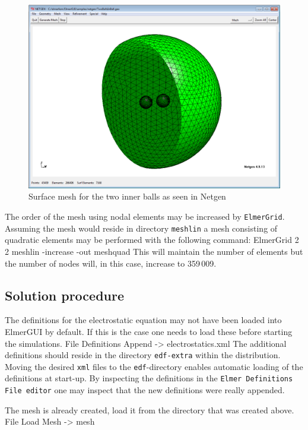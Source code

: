 \begin{figure}[h]
\centering
\includegraphics[width=140mm]{netgen_capture}
\caption{Surface mesh for the two inner balls as seen in Netgen}\label{fg:ballsnetgen}
\end{figure}  

The order of the mesh using nodal elements 
may be increased by \texttt{ElmerGrid}. Assuming the mesh would reside in directory \texttt{meshlin}
a mesh consisting of quadratic elements may be performed with the following command:
\ttbegin
ElmerGrid 2 2 meshlin -increase -out meshquad
\ttend
This will maintain the number of elements but the number of nodes will, in this case, increase to 359\,009. 


\subsection*{Solution procedure}

The definitions for the electrostatic equation may not have been loaded into ElmerGUI by default. If this is the case 
one needs to load these before starting the simulations.
\ttbegin
File 
  Definitions
    Append -> electrostatics.xml
\ttend
The additional definitions should reside in the directory \texttt{edf-extra} within the distribution.
Moving the desired \texttt{xml} files to the \texttt{edf}-directory enables automatic loading of the 
definitions at start-up. By inspecting the definitions in the \texttt{Elmer Definitions File editor} one
may inspect that the new definitions were really appended. 


The mesh is already created, load it from the directory that was created above.
\ttbegin
File 
  Load Mesh -> mesh
\ttend

